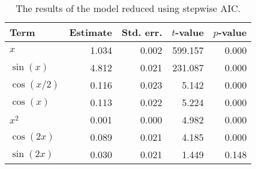 \begin{table}[!h]

\caption{\label{tab:stepwise-regression}The results of the model reduced using stepwise \ac{AIC}.}
\centering
\begin{tabular}{lrrrr}
\toprule
Term & Estimate & Std. err. & \(t\)-value & \(p\)-value\\
\midrule
\(x\) & 1.034 & 0.002 & 599.157 & 0.000\\
\(\sin(x)\) & 4.812 & 0.021 & 231.087 & 0.000\\
\(\cos(x/2)\) & 0.116 & 0.023 & 5.142 & 0.000\\
\(\cos(x)\) & 0.113 & 0.022 & 5.224 & 0.000\\
\(x^2\) & 0.001 & 0.000 & 4.982 & 0.000\\
\(\cos(2x)\) & 0.089 & 0.021 & 4.185 & 0.000\\
\(\sin(2x)\) & 0.030 & 0.021 & 1.449 & 0.148\\
\bottomrule
\end{tabular}
\end{table}